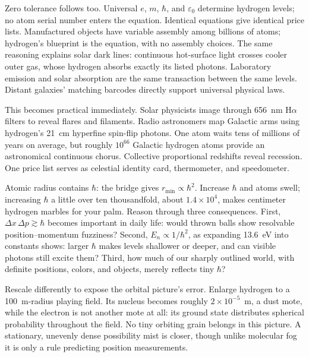 Zero tolerance follows too. Universal \(e\), \(m\), \(\hbar\), and \(\varepsilon_0\) determine hydrogen levels; no atom serial number enters the equation. Identical equations give identical price lists. Manufactured objects have variable assembly among billions of atoms; hydrogen's blueprint is the equation, with no assembly choices. The same reasoning explains solar dark lines: continuous hot-surface light crosses cooler outer gas, whose hydrogen absorbs exactly its listed photons. Laboratory emission and solar absorption are the same transaction between the same levels. Distant galaxies' matching barcodes directly support universal physical laws.

This becomes practical immediately. Solar physicists image through 656~nm H\(\alpha\) filters to reveal flares and filaments. Radio astronomers map Galactic arms using hydrogen's 21~cm hyperfine spin-flip photons. One atom waits tens of millions of years on average, but roughly \(10^{66}\) Galactic hydrogen atoms provide an astronomical continuous chorus. Collective proportional redshifts reveal recession. One price list serves as celestial identity card, thermometer, and speedometer.


\begin{thought}
Atomic radius contains \(\hbar\): the bridge gives \(r_{\min}\propto\hbar^2\). Increase \(\hbar\) and atoms swell; increasing \(\hbar\) a little over ten thousandfold, about \(1.4\times10^4\), makes centimeter hydrogen marbles for your palm. Reason through three consequences. First, \(\Delta x\,\Delta p\gtrsim\hbar\) becomes important in daily life: would thrown balls show resolvable position--momentum fuzziness? Second, \(E_n\propto 1/\hbar^2\), as expanding 13.6~eV into constants shows: larger \(\hbar\) makes levels shallower or deeper, and can visible photons still excite them? Third, how much of our sharply outlined world, with definite positions, colors, and objects, merely reflects tiny \(\hbar\)?
\end{thought}

Rescale differently to expose the orbital picture's error. Enlarge hydrogen to a 100~m-radius playing field. Its nucleus becomes roughly \(2\times10^{-5}\)~m, a dust mote, while the electron is not another mote at all: its ground state distributes spherical probability throughout the field. No tiny orbiting grain belongs in this picture. A stationary, unevenly dense possibility mist is closer, though unlike molecular fog it is only a rule predicting position measurements.

